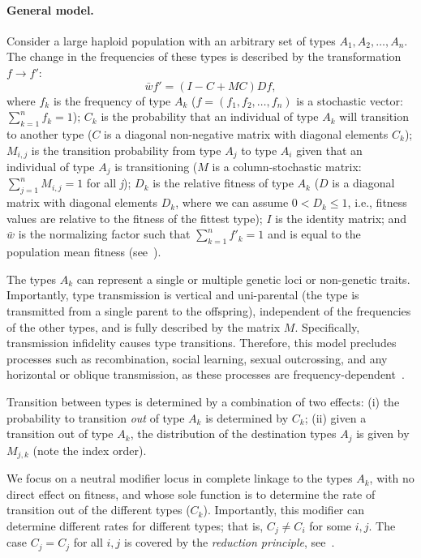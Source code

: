 \documentclass[9pt, a4paper, twocolumn]{extarticle}
\begin{document}
\paragraph*{General model.}\label{sec:general_model}
Consider a large haploid population with an arbitrary set of types $A_1, A_2, \ldots, A_n$.
The change in the frequencies of these types is described by the transformation $f \to f'$: 
\begin{equation}\label{eq:model}
\bar{w} f' = (I-C+MC)D f,
\end{equation}
where $f_k$ is the frequency of type $A_k$ ($f=(f_1, f_2, \ldots, f_n)$ is a stochastic vector: $\sum_{k=1}^n{f_k} = 1$);
$C_k$ is the probability that an individual of type $A_k$ will transition to another type ($C$ is a diagonal non-negative matrix with diagonal elements $C_k$);
$M_{i,j}$ is the transition probability from type $A_j$ to type $A_i$ given that an individual of type $A_j$ is transitioning ($M$ is a column-stochastic matrix: $\sum_{j=1}^n {M_{i,j}} = 1$ for all \emph{j}); 
$D_k$ is the relative fitness of type $A_k$ ($D$ is a diagonal matrix with diagonal elements $D_k$, where we can assume $0 < D_k \le 1$, i.e., fitness values are relative to the fitness of the fittest type); 
$I$ is the identity matrix;
and $\bar{w}$ is the normalizing factor such that $\sum_{k=1}^n{f'_k}=1$ and is equal to the population mean fitness (see~).

The types $A_k$ can represent a single or multiple genetic loci or non-genetic traits.
Importantly, type transmission is vertical and uni-parental (the type is transmitted from a single parent to the offspring), independent of the frequencies of the other types, and is fully described by the matrix $M$. Specifically, transmission infidelity causes type transitions.
Therefore, this model precludes processes such as recombination, social learning, sexual outcrossing, and any horizontal or oblique transmission, as these processes are frequency-dependent~\cite[pg.~54]{Cavalli-Sforza1981}.

Transition between types is determined by a combination of two effects:
(i) the probability to transition \emph{out} of type $A_k$ is determined by $C_k$;
(ii) given a transition out of type $A_k$, the distribution of the destination types $A_j$ is given by $M_{j,k}$ (note the index order).

We focus on a neutral modifier locus in complete linkage to the types $A_k$, with no direct effect on fitness, and whose sole function is to determine the rate of transition out of the different types ($C_k$).
Importantly, this modifier can determine different rates for different types; that is, $C_j \ne C_i$ for some $i,j$. The case $C_j = C_j$ for all $i,j$ is covered by the \emph{reduction principle}, see~\citet{Altenberg2017}.
\end{document}
